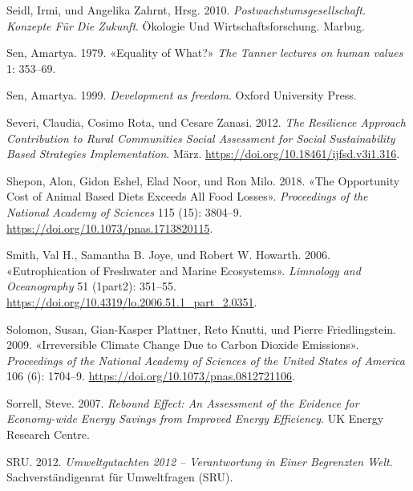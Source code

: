\documentclass[
  nswissgerman,
  a4paper,
  DIV=11,
  numbers=noendperiod,
  oneside,
  openany]{scrreprt}
\newlength{\cslhangindent}
\newenvironment{CSLReferences}[2] %
 {\begin{list}{}{%
  \setlength{\itemindent}{0pt}
  \setlength{\leftmargin}{0pt}
  \setlength{\parsep}{0pt}
  \ifodd #1
   \setlength{\leftmargin}{\cslhangindent}
   \setlength{\itemindent}{-1\cslhangindent}
  \fi
  \setlength{\itemsep}{#2\baselineskip}}}
 {\end{list}}
\begin{document}
\begin{CSLReferences}{1}{1}
Seidl, Irmi, und Angelika Zahrnt, Hrsg. 2010.
\emph{Postwachstumsgesellschaft. {Konzepte} F{ü}r Die {Zukunft}}.
{Ö}kologie Und {Wirtschaftsforschung}. Marbug.

Sen, Amartya. 1979. {«Equality of {What}?»} \emph{The Tanner lectures on
human values} 1: 353--69.

Sen, Amartya. 1999. \emph{Development as freedom}. Oxford University
Press.

Severi, Claudia, Cosimo Rota, und Cesare Zanasi. 2012. \emph{The
{Resilience Approach Contribution} to {Rural Communities Social
Assessment} for {Social Sustainability Based Strategies
Implementation}}. März. \url{https://doi.org/10.18461/ijfsd.v3i1.316}.

Shepon, Alon, Gidon Eshel, Elad Noor, und Ron Milo. 2018. {«The
Opportunity Cost of Animal Based Diets Exceeds All Food Losses»}.
\emph{Proceedings of the National Academy of Sciences} 115 (15):
3804--9. \url{https://doi.org/10.1073/pnas.1713820115}.

Smith, Val H., Samantha B. Joye, und Robert W. Howarth. 2006.
{«Eutrophication of Freshwater and Marine Ecosystems»}. \emph{Limnology
and Oceanography} 51 (1part2): 351--55.
\url{https://doi.org/10.4319/lo.2006.51.1_part_2.0351}.

Solomon, Susan, Gian-Kasper Plattner, Reto Knutti, und Pierre
Friedlingstein. 2009. {«Irreversible Climate Change Due to Carbon
Dioxide Emissions»}. \emph{Proceedings of the National Academy of
Sciences of the United States of America} 106 (6): 1704--9.
\url{https://doi.org/10.1073/pnas.0812721106}.

Sorrell, Steve. 2007. \emph{Rebound {Effect}: {An Assessment} of the
{Evidence} for {Economy-wide Energy Savings} from {Improved Energy
Efficiency}}. UK Energy Research Centre.

SRU. 2012. \emph{Umweltgutachten 2012 -- {Verantwortung} in Einer
Begrenzten {Welt}}. Sachverständigenrat für Umweltfragen (SRU).


\end{CSLReferences}
\end{document}
